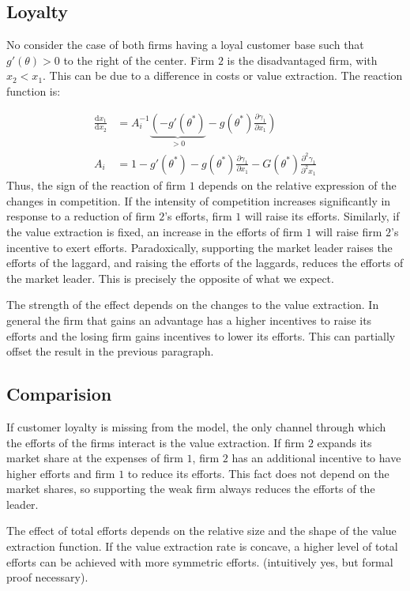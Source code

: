 \documentclass[a4paper, 11pt]{article}
\renewcommand{\d}{\text{d}}
\begin{document}
\subsection{Loyalty}
No consider the case of both firms having a loyal customer base such that $g'(\theta)>0$ to the right of the center.  Firm $2$ is the disadvantaged firm, with $x_2<x_1$. This can be due to a difference in costs or value extraction. The reaction function is:

\begin{align}
\frac{\d x_1}{\d x_2} &= A_i^{-1} \underbrace{\left(-g'(\theta^*)\right.}_{>0} - \left.g(\theta^*)\frac{\partial \gamma_1}{\partial x_1}\right)\\
A_i &= 1 - g'(\theta^*)-g(\theta^*)\frac{\partial \gamma_1}{\partial x_1}-G(\theta^*)\frac{\partial^2 \gamma_1}{\partial^2 x_1}
\end{align}
Thus, the sign of the reaction of firm $1$ depends on the relative expression of the changes in competition. If the intensity of competition increases significantly in response to a reduction of firm $2$'s efforts, firm $1$ will raise its efforts. Similarly, if the value extraction is fixed, an increase in the efforts of firm $1$ will raise firm $2$'s incentive to exert efforts. Paradoxically, supporting the market leader raises the efforts of the laggard, and raising the efforts of the laggards, reduces the efforts of the market leader. This is precisely the opposite of what we expect. 

The strength of the effect depends on the changes to the value extraction. In general the firm that gains an advantage has a higher incentives to raise its efforts and the losing firm gains incentives to lower its efforts. This can partially offset the result in the previous paragraph.

\subsection{Comparision}

If customer loyalty is missing from the model, the only channel through which the efforts of the firms interact is the value extraction. If firm $2$ expands its market share at the expenses of firm $1$, firm $2$ has an additional incentive to have higher efforts and firm $1$ to reduce its efforts. This fact does not depend on the market shares, so supporting the weak firm always reduces the efforts of the leader.

The effect of total efforts depends on the relative size and the shape of the value extraction function. If the value extraction rate is concave, a higher level of total efforts can be achieved with more symmetric efforts. (intuitively yes, but formal proof necessary).
\end{document}
